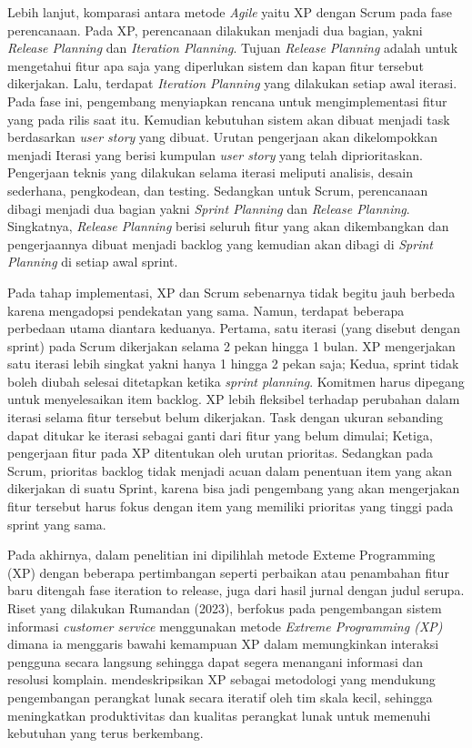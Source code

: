 Lebih lanjut, komparasi antara metode \textit{Agile} yaitu XP dengan Scrum pada fase perencanaan. Pada XP, perencanaan dilakukan menjadi dua bagian, yakni \textit{Release Planning} dan \textit{Iteration Planning}. Tujuan \textit{Release Planning} adalah untuk mengetahui fitur apa saja yang diperlukan sistem dan kapan fitur tersebut dikerjakan. Lalu, terdapat \textit{Iteration Planning} yang dilakukan setiap awal iterasi. Pada fase ini, pengembang menyiapkan rencana untuk mengimplementasi fitur yang pada rilis saat itu. Kemudian kebutuhan sistem akan dibuat menjadi task berdasarkan \textit{user story} yang dibuat. Urutan pengerjaan akan dikelompokkan menjadi Iterasi yang berisi kumpulan \textit{user story} yang telah diprioritaskan. Pengerjaan teknis yang dilakukan selama iterasi meliputi analisis, desain sederhana, pengkodean, dan testing. Sedangkan untuk Scrum, perencanaan dibagi menjadi dua bagian yakni \textit{Sprint Planning} dan \textit{Release Planning}. Singkatnya, \textit{Release Planning} berisi seluruh fitur yang akan dikembangkan dan pengerjaannya dibuat menjadi backlog yang kemudian akan dibagi di \textit{Sprint Planning} di setiap awal sprint.

Pada tahap implementasi, XP dan Scrum sebenarnya tidak begitu jauh berbeda karena mengadopsi pendekatan yang sama. Namun, terdapat beberapa perbedaan utama diantara keduanya. Pertama, satu iterasi (yang disebut dengan sprint) pada Scrum dikerjakan selama 2 pekan hingga 1 bulan. XP mengerjakan satu iterasi lebih singkat yakni hanya 1 hingga 2 pekan saja; Kedua, sprint tidak boleh diubah selesai ditetapkan ketika \textit{sprint planning}. Komitmen harus dipegang untuk menyelesaikan item backlog. XP lebih fleksibel terhadap perubahan dalam iterasi selama fitur tersebut belum dikerjakan. Task dengan ukuran sebanding dapat ditukar ke iterasi sebagai ganti dari fitur yang belum dimulai; Ketiga, pengerjaan fitur pada XP ditentukan oleh urutan prioritas. Sedangkan pada Scrum, prioritas backlog tidak menjadi acuan dalam penentuan item yang akan dikerjakan di suatu Sprint, karena bisa jadi pengembang yang akan mengerjakan fitur tersebut harus fokus dengan item yang memiliki prioritas yang tinggi pada sprint yang sama. 

Pada akhirnya, dalam penelitian ini dipilihlah metode Exteme Programming (XP) dengan beberapa pertimbangan seperti perbaikan atau penambahan fitur baru ditengah fase iteration to release, juga dari hasil jurnal dengan judul serupa. Riset yang dilakukan Rumandan (2023), berfokus pada pengembangan sistem informasi \textit{
customer service} menggunakan metode \textit{Extreme Programming (XP)} dimana ia menggaris bawahi kemampuan XP dalam memungkinkan interaksi pengguna secara langsung sehingga dapat segera menangani informasi dan resolusi komplain. \textcite{article:matharu} mendeskripsikan XP sebagai metodologi yang mendukung pengembangan perangkat lunak secara iteratif oleh tim skala kecil, sehingga meningkatkan produktivitas dan kualitas perangkat lunak untuk memenuhi kebutuhan yang terus berkembang.

